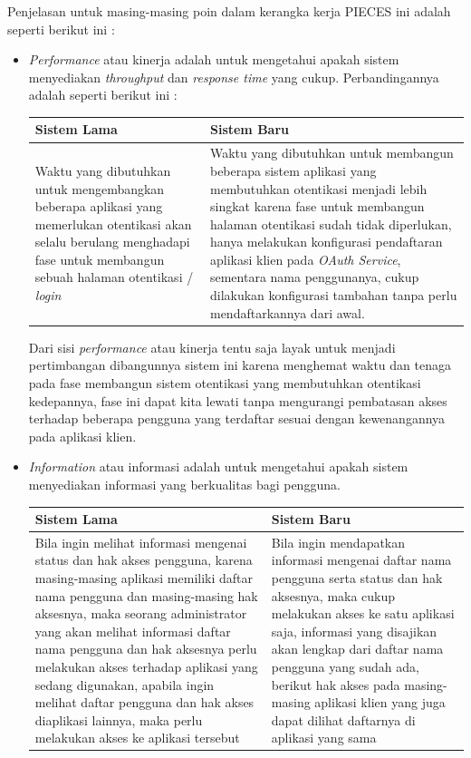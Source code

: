\documentclass[pdftex,12pt, oneside]{article}
\begin{document}
\begin{enumerate}
Penjelasan untuk masing-masing poin dalam kerangka kerja PIECES ini adalah seperti berikut ini :

\begin{itemize}
	\item \textit{Performance} atau kinerja adalah untuk mengetahui apakah sistem menyediakan \textit{throughput} dan \textit{response time} yang cukup. Perbandingannya adalah seperti berikut ini :
	
	\begin{table}[!h]
		\centering
		\begin{tabular}{| p{7cm} | p{7cm} |}
			\hline
			Sistem Lama & Sistem Baru \\
			\hline
			Waktu yang dibutuhkan untuk mengembangkan beberapa aplikasi yang memerlukan otentikasi akan selalu berulang menghadapi fase untuk membangun sebuah halaman otentikasi / \textit{login} & Waktu yang dibutuhkan untuk membangun beberapa sistem aplikasi yang membutuhkan otentikasi menjadi lebih singkat karena fase untuk membangun halaman otentikasi sudah tidak diperlukan, hanya melakukan konfigurasi pendaftaran aplikasi klien pada \textit{OAuth Service}, sementara nama penggunanya, cukup dilakukan konfigurasi tambahan tanpa perlu mendaftarkannya dari awal. \\
			\hline
		\end{tabular}
	\end{table}
	
	Dari sisi \textit{performance} atau kinerja tentu saja layak untuk menjadi pertimbangan dibangunnya sistem ini karena menghemat waktu dan tenaga pada fase membangun sistem otentikasi yang membutuhkan otentikasi kedepannya, fase ini dapat kita lewati tanpa mengurangi pembatasan akses terhadap beberapa pengguna yang terdaftar sesuai dengan kewenangannya pada aplikasi klien.
	
	
\item \textit{Information} atau informasi adalah untuk mengetahui apakah sistem menyediakan informasi yang berkualitas bagi pengguna. 

\begin{table}[!h]
	\centering
	\begin{tabular}{| p{7cm} | p{7cm} |}
		\hline
		Sistem Lama & Sistem Baru \\
		\hline
		Bila ingin melihat informasi mengenai status dan hak akses pengguna, karena masing-masing aplikasi memiliki daftar nama pengguna dan masing-masing hak aksesnya, maka seorang administrator yang akan melihat informasi daftar nama pengguna dan hak aksesnya perlu melakukan akses terhadap aplikasi yang sedang digunakan, apabila ingin melihat daftar pengguna dan hak akses diaplikasi lainnya, maka perlu melakukan akses ke aplikasi tersebut & Bila ingin mendapatkan informasi mengenai daftar nama pengguna serta status dan hak aksesnya, maka cukup melakukan akses ke satu aplikasi saja, informasi yang disajikan akan lengkap dari daftar nama pengguna yang sudah ada, berikut hak akses pada masing-masing aplikasi klien yang juga dapat dilihat daftarnya di aplikasi yang sama \\
		\hline
	\end{tabular}
\end{table}


\end{itemize}
\end{enumerate}
\end{document}
